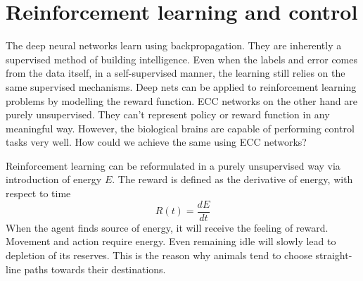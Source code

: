 \documentclass[12pt]{article}
\begin{document}
\section{Reinforcement learning and control}

The deep neural networks learn using backpropagation. They are inherently a supervised method of building intelligence. Even when the labels and error comes from the data itself, in a self-supervised manner, the learning still relies on the same supervised mechanisms. Deep nets can be applied to reinforcement learning problems by modelling the reward function. ECC networks on the other hand are purely unsupervised. They can't represent policy or reward function in any meaningful way. However, the biological brains are capable of performing control tasks very well. How could we achieve the same using ECC networks?


Reinforcement learning can be reformulated in a purely unsupervised way via introduction of energy $E$. The reward is defined as the derivative of energy, with respect to time
\[
R(t) = \frac{dE}{dt}
\]
When the agent finds source of energy, it will receive the feeling of reward.
Movement and action require energy. Even remaining idle will slowly lead to depletion of its reserves. This is the reason why animals tend to choose straight-line paths towards their destinations. 
\end{document}
